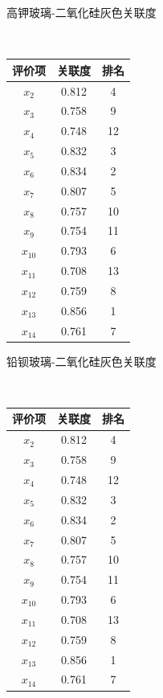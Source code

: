 \documentclass[UTF8]{ctexart}
\begin{document}
\begin{minipage}{\textwidth}
    \begin{minipage}[t]{0.48\textwidth}
    \makeatletter{}
    \caption{高钾玻璃-二氧化硅灰色关联度}
    ~~~~~~~~~~~~~~~~\begin{tabular}{|c|c|c|}
        \hline
         评价项 & 关联度 & 排名 \\ \hline
            $x_{2}$ & 0.812 & 4 \\ \hline
            $x_{3}$ & 0.758 & 9 \\ \hline
            $x_{4}$ & 0.748 & 12 \\ \hline
            $x_{5}$ & 0.832 & 3 \\ \hline
            $x_{6}$ & 0.834 & 2 \\ \hline
            $x_{7}$ & 0.807 & 5 \\ \hline
            $x_{8}$ & 0.757 & 10 \\ \hline
            $x_{9}$ & 0.754 & 11 \\ \hline
            $x_{10}$ & 0.793 & 6 \\ \hline
            $x_{11}$ & 0.708 & 13 \\ \hline
            $x_{12}$ & 0.759 & 8 \\ \hline
            $x_{13}$ & 0.856 & 1 \\ \hline
            $x_{14}$ & 0.761 & 7 \\ \hline
    \end{tabular}
    \label{sample-table}
    \end{minipage}
    \begin{minipage}[t]{0.48\textwidth}
    \makeatletter{}
    \caption{铅钡玻璃-二氧化硅灰色关联度}
    ~~~~~~~~~~~~~~~~\begin{tabular}{|c|c|c|}
        \hline
            评价项 & 关联度 & 排名 \\ \hline
            $x_{2}$ & 0.812 & 4 \\ \hline
            $x_{3}$ & 0.758 & 9 \\ \hline
            $x_{4}$ & 0.748 & 12 \\ \hline
            $x_{5}$ & 0.832 & 3 \\ \hline
            $x_{6}$ & 0.834 & 2 \\ \hline
            $x_{7}$ & 0.807 & 5 \\ \hline
            $x_{8}$ & 0.757 & 10 \\ \hline
            $x_{9}$ & 0.754 & 11 \\ \hline
            $x_{10}$ & 0.793 & 6 \\ \hline
            $x_{11}$ & 0.708 & 13 \\ \hline
            $x_{12}$ & 0.759 & 8 \\ \hline
            $x_{13}$ & 0.856 & 1 \\ \hline
            $x_{14}$ & 0.761 & 7 \\ \hline
    \end{tabular}
    \end{minipage}
    \end{minipage}
~\\
\end{document}
